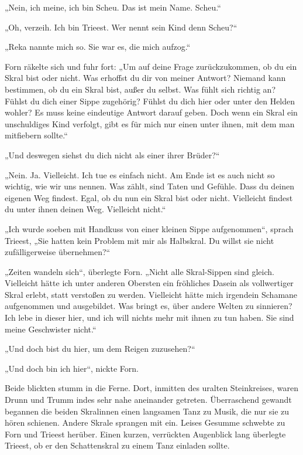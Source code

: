 „Nein, ich meine, ich bin Scheu. Das ist mein Name. Scheu.“

„Oh, verzeih. Ich bin Trieest. Wer nennt sein Kind denn Scheu?“

„Reka nannte mich so. Sie war es, die mich aufzog.“

Forn räkelte sich und fuhr fort: „Um auf deine Frage zurückzukommen, ob du ein Skral bist oder nicht. Was erhoffst du dir von meiner Antwort? Niemand kann bestimmen, ob du ein Skral bist, außer du selbst. Was fühlt sich richtig an? Fühlst du dich einer Sippe zugehörig? Fühlst du dich hier oder unter den Helden wohler? Es muss keine eindeutige Antwort darauf geben. Doch wenn ein Skral ein unschuldiges Kind verfolgt, gibt es für mich nur einen unter ihnen, mit dem man mitfiebern sollte.“

„Und deswegen siehst du dich nicht als einer ihrer Brüder?“

„Nein. Ja. Vielleicht. Ich tue es einfach nicht. Am Ende ist es auch nicht so wichtig, wie wir uns nennen. Was zählt, sind Taten und Gefühle. Dass du deinen eigenen Weg findest. Egal, ob du nun ein Skral bist oder nicht. Vielleicht findest du unter ihnen deinen Weg. Vielleicht nicht.“

„Ich wurde soeben mit Handkuss von einer kleinen Sippe aufgenommen“, sprach Trieest, „Sie hatten kein Problem mit mir als Halbskral. Du willst sie nicht zufälligerweise übernehmen?“

„Zeiten wandeln sich“, überlegte Forn. „Nicht alle Skral-Sippen sind gleich. Vielleicht hätte ich unter anderen Obersten ein fröhliches Dasein als vollwertiger Skral erlebt, statt verstoßen zu werden. Vielleicht hätte mich irgendein Schamane aufgenommen und ausgebildet. Was bringt es, über andere Welten zu sinnieren? Ich lebe in dieser hier, und ich will nichts mehr mit ihnen zu tun haben. Sie sind meine Geschwister nicht.“

„Und doch bist du hier, um dem Reigen zuzusehen?“

„Und doch bin ich hier“, nickte Forn.

Beide blickten stumm in die Ferne. Dort, inmitten des uralten Steinkreises, waren Drunn und Trumm indes sehr nahe aneinander getreten. Überraschend gewandt begannen die beiden Skralinnen einen langsamen Tanz zu Musik, die nur sie zu hören schienen. Andere Skrale sprangen mit ein. Leises Gesumme schwebte zu Forn und Trieest herüber. Einen kurzen, verrückten Augenblick lang überlegte Trieest, ob er den Schattenskral zu einem Tanz einladen sollte.

